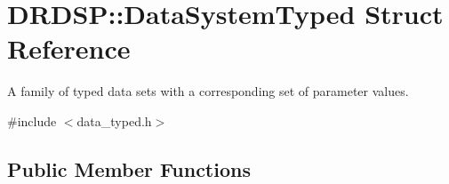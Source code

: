 \hypertarget{struct_d_r_d_s_p_1_1_data_system_typed}{\section{D\-R\-D\-S\-P\-:\-:Data\-System\-Typed Struct Reference}
\label{struct_d_r_d_s_p_1_1_data_system_typed}
}


A family of typed data sets with a corresponding set of parameter values.  




{\ttfamily \#include $<$data\-\_\-typed.\-h$>$}

\subsection*{Public Member Functions}
